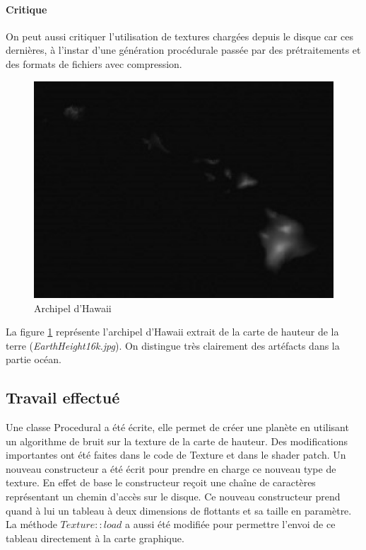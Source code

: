     \paragraph{Critique} On peut aussi critiquer l'utilisation de textures chargées depuis le disque car ces dernières, à l'instar d'une génération procédurale passée par des prétraitements et des formats de fichiers avec compression.
    
    \begin{figure}
        \centering
        \includegraphics[width=12cm]{img/hawaii.png}
        \caption{Archipel d'Hawaii}
        \label{fig:hawaii}
    \end{figure}
    
    La figure \ref{fig:hawaii} représente l'archipel d'Hawaii extrait de la carte de hauteur de la terre
    (\textit{EarthHeight16k.jpg}). On distingue très clairement des artéfacts dans la partie océan.
    
    \subsection{Travail effectué}
    Une classe Procedural a été écrite, elle permet de créer une planète en utilisant un algorithme de bruit
    sur la texture de la carte de hauteur.
    Des modifications importantes ont été faites dans le code de Texture et dans le shader patch.
    Un nouveau constructeur a été écrit pour prendre en charge ce nouveau type de texture. En effet de 
    base le constructeur reçoit une chaîne de caractères représentant un chemin d'accès sur le disque.
    Ce nouveau constructeur prend quand à lui un tableau à deux dimensions de flottants et sa taille en paramètre.\\
    La méthode $Texture::load$ a aussi été modifiée pour permettre l'envoi de ce tableau directement à la carte graphique.\\
    
